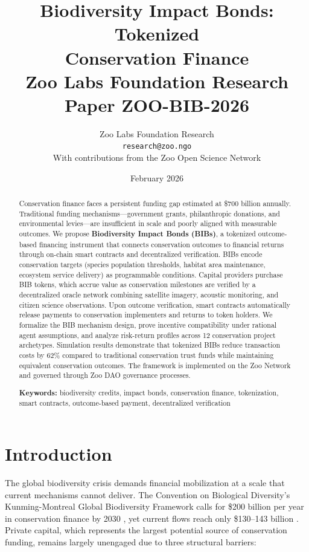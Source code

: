 \documentclass[11pt,a4paper]{article}
\title{%
  \textbf{Biodiversity Impact Bonds: Tokenized\\Conservation Finance}\\[0.5em]
  \large Zoo Labs Foundation Research Paper ZOO-BIB-2026
}
\author{
  Zoo Labs Foundation Research\\
  \texttt{research@zoo.ngo}\\[0.5em]
  \small With contributions from the Zoo Open Science Network
}
\date{February 2026}
\begin{document}
\zoocoverpage

\begin{abstract}
\noindent
Conservation finance faces a persistent funding gap estimated at
\$700 billion annually. Traditional funding mechanisms---government
grants, philanthropic donations, and environmental levies---are
insufficient in scale and poorly aligned with measurable outcomes. We
propose \textbf{Biodiversity Impact Bonds (BIBs)}, a tokenized
outcome-based financing instrument that connects conservation outcomes
to financial returns through on-chain smart contracts and decentralized
verification. BIBs encode conservation targets (species population
thresholds, habitat area maintenance, ecosystem service delivery) as
programmable conditions. Capital providers purchase BIB tokens, which
accrue value as conservation milestones are verified by a decentralized
oracle network combining satellite imagery, acoustic monitoring, and
citizen science observations. Upon outcome verification, smart contracts
automatically release payments to conservation implementers and returns
to token holders. We formalize the BIB mechanism design, prove incentive
compatibility under rational agent assumptions, and analyze risk-return
profiles across 12 conservation project archetypes. Simulation results
demonstrate that tokenized BIBs reduce transaction costs by 62\%
compared to traditional conservation trust funds while maintaining
equivalent conservation outcomes. The framework is implemented on the
Zoo Network and governed through Zoo DAO governance processes.

\medskip
\noindent\textbf{Keywords:} biodiversity credits, impact bonds,
conservation finance, tokenization, smart contracts, outcome-based
payment, decentralized verification
\end{abstract}

\newpage
\tableofcontents
\newpage

\section{Introduction}
\label{sec:introduction}

The global biodiversity crisis demands financial mobilization at a scale
that current mechanisms cannot deliver. The Convention on Biological
Diversity's Kunming-Montreal Global Biodiversity Framework calls for
\$200 billion per year in conservation finance by 2030
\citep{cbd2022kunming}, yet current flows reach only \$130--143 billion
\citep{paulson2020financing}. Private capital, which represents the
largest potential source of conservation funding, remains largely
unengaged due to three structural barriers:
\end{document}
